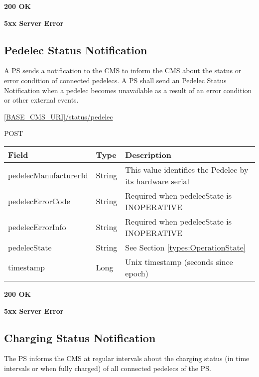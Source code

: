  \textbf{200 OK}

 \textbf{5xx Server Error}

\subsection{Pedelec Status Notification}

A \acs{PS} sends a notification to the \acs{CMS} to inform the \acs{CMS} about the status or error condition of connected pedelecs. A \acs{PS} shall send an Pedelec Status Notification when a pedelec becomes unavailable as a result of an error condition or other external events.

 \url{[BASE_CMS_URI]/status/pedelec}

 POST

\begin{table}[!h]
\vspace{-7mm}
\begin{tabularx}{\linewidth}{ | l | l | X | }
  \hline
  \rowcolor{table-head}
  Field & Type & Description \\
  \hline
  pedelecManufacturerId & String 		& This value identifies the Pedelec by its hardware serial\\
  pedelecErrorCode & String & Required when pedelecState is INOPERATIVE \\
  pedelecErrorInfo & String & Required when pedelecState is INOPERATIVE \\
  pedelecState & String & See Section \ref{types:OperationState} \\
  timestamp & Long & Unix timestamp (seconds since epoch) \\
  \hline
\end{tabularx}
\end{table}

 \textbf{200 OK}

 \textbf{5xx Server Error}


\subsection{Charging Status Notification}
\label{ps:charging-status}

The \acs{PS} informs the \acs{CMS} at regular intervals about the charging status (in time intervals or when fully charged) of all connected pedelecs of the \acs{PS}.

